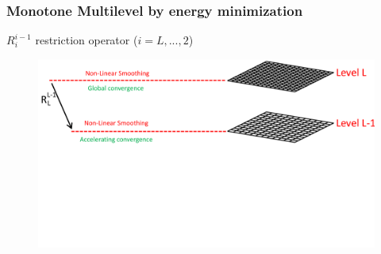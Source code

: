 \documentclass[8pt, oneside]{beamer}   	%
\newcommand{\titlecolor}[1]{\frametitle{\textcolor{dkgrey}{ \textbf{#1}}}}
\begin{document}
\begin{frame}
\titlecolor{Monotone Multilevel by energy minimization}
$R_{i}^{i-1}$ restriction operator ($ i=L,...,2 $)
\begin{figure}[htbp!]
		\centering
	\includegraphics[width=1\textwidth]{img/multigridexplained2.pdf}
\end{figure}
\end{frame}
\end{document}
